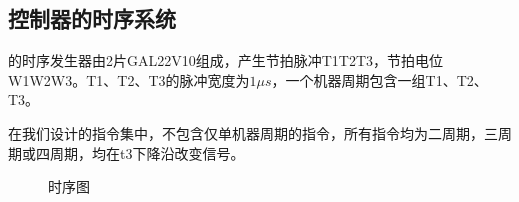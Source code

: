 \subsection{控制器的时序系统}
\tec 的时序发生器由2片GAL22V10组成，产生节拍脉冲T1\comma T2\comma T3，节拍电位W1\comma W2\comma W3。T1、T2、T3的脉冲宽度为$1\mu s$，一个机器周期包含一组T1、T2、T3。
\par
在我们设计的指令集中，不包含仅单机器周期的指令，所有指令均为二周期，三周期或四周期，均在t3下降沿改变信号。
\begin{figure}[htbp]
    \label{clock}
    \caption{\tec 时序图}
\end{figure}
